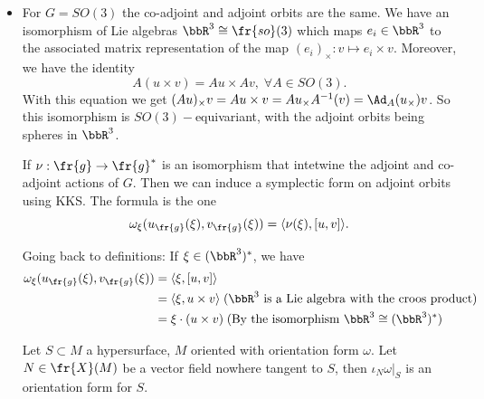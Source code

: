 \begin{itemize}
\begin{equation}
\begin{split}
            \iota_{u_{\fr{g}^*}}\omega\big|_\xi(v_{\fr{g}^*}(\xi))&=\langle\xi,[u,v] \rangle\\
            &=\langle\xi,[u,v] \rangle\\
            &=v_{\fr{g}^*}(\xi)(u)\\
            &=du\big|_\xi v_{\fr{g}^*}(\xi)\;(\text{by the identification }\fr{g}^{**}=\fr{g})
        \end{split}
    \end{equation}
    \item For $G=SO(3)$ the co-adjoint and adjoint orbits are the same. We have an isomorphism of Lie algebras
    $\bbR^3\cong\fr{so}(3)$ which maps $e_i\in\bbR^3$ to the associated matrix representation of the map 
    $(e_i)_\times:v\mapsto e_i\times v$. Moreover, we have the identity 
    \begin{equation}
        A(u\times v)= Au\times Av,\; \forall A\in SO(3).
    \end{equation}
    With this equation we get $(Au)_\times v = Au\times v = Au_\times A^{-1}(v)=\Ad_A(u_\times)v$. So this isomorphism 
    is $SO(3)-$equivariant, with the adjoint orbits being spheres in $\bbR^3$.
    \begin{dang}
     \begin{remark}
        If $\nu: \fr{g}\to \fr{g}^*$ is an isomorphism that intetwine the adjoint and co-adjoint actions of $G$. Then we 
        can induce a symplectic form on adjoint orbits using KKS. The formula is the one 
        \begin{equation}
            \omega_\xi(u_{\fr{g}}(\xi),v_{\fr{g}}(\xi))=\langle \nu(\xi), [u,v]\rangle.
        \end{equation}
    \end{remark}    
    \end{dang}

    Going back to definitions: If $\xi\in(\bbR^3)^*$, we have 
    \begin{equation}
        \begin{split}
            \omega_\xi(u_{\fr{g}}(\xi),v_{\fr{g}}(\xi))&=\langle\xi,[u,v]\rangle\\
        &=\langle \xi, u\times v\rangle \;(\bbR^3\text{ is a Lie algebra with the croos product})\\
        &=\xi\cdot (u\times v)\;(\text{By the isomorphism }\bbR^3\cong(\bbR^3)^*)
        \end{split}
    \end{equation}
    \begin{dang}
    \begin{remark}
        Let $S\subset M$ a hypersurface, $M$ oriented with orientation form $\omega$. Let 
        $N\in\fr{X}(M)$ be a vector field nowhere tangent to $S$, then $\iota_N\omega|_S$ is an orientation 
        form for $S$.
    \end{remark}        
    \end{dang}


\end{itemize}
